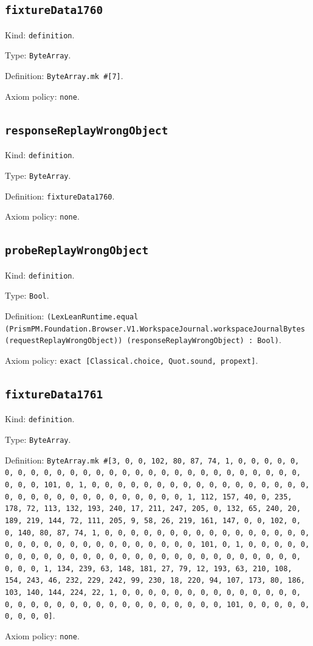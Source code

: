\documentclass[11pt]{article}
\begin{document}
\subsection*{\texttt{fixtureData1760}}
\noindent Kind: \texttt{definition}.\par
\noindent Type: \texttt{ByteArray}.\par
\noindent Definition: \texttt{ByteArray.mk \#[7]}.\par
\noindent Axiom policy: \texttt{none}.\par
\subsection*{\texttt{responseReplayWrongObject}}
\noindent Kind: \texttt{definition}.\par
\noindent Type: \texttt{ByteArray}.\par
\noindent Definition: \texttt{fixtureData1760}.\par
\noindent Axiom policy: \texttt{none}.\par
\subsection*{\texttt{probeReplayWrongObject}}
\noindent Kind: \texttt{definition}.\par
\noindent Type: \texttt{Bool}.\par
\noindent Definition: \texttt{(LexLeanRuntime.equal (PrismPM.Foundation.Browser.V1.WorkspaceJournal.workspaceJournalBytes (requestReplayWrongObject)) (responseReplayWrongObject) : Bool)}.\par
\noindent Axiom policy: \texttt{exact [Classical.choice, Quot.sound, propext]}.\par
\subsection*{\texttt{fixtureData1761}}
\noindent Kind: \texttt{definition}.\par
\noindent Type: \texttt{ByteArray}.\par
\noindent Definition: \texttt{ByteArray.mk \#[3, 0, 0, 102, 80, 87, 74, 1, 0, 0, 0, 0, 0, 0, 0, 0, 0, 0, 0, 0, 0, 0, 0, 0, 0, 0, 0, 0, 0, 0, 0, 0, 0, 0, 0, 0, 0, 0, 0, 101, 0, 1, 0, 0, 0, 0, 0, 0, 0, 0, 0, 0, 0, 0, 0, 0, 0, 0, 0, 0, 0, 0, 0, 0, 0, 0, 0, 0, 0, 0, 0, 0, 0, 1, 112, 157, 40, 0, 235, 178, 72, 113, 132, 193, 240, 17, 211, 247, 205, 0, 132, 65, 240, 20, 189, 219, 144, 72, 111, 205, 9, 58, 26, 219, 161, 147, 0, 0, 102, 0, 0, 140, 80, 87, 74, 1, 0, 0, 0, 0, 0, 0, 0, 0, 0, 0, 0, 0, 0, 0, 0, 0, 0, 0, 0, 0, 0, 0, 0, 0, 0, 0, 0, 0, 0, 0, 0, 101, 0, 1, 0, 0, 0, 0, 0, 0, 0, 0, 0, 0, 0, 0, 0, 0, 0, 0, 0, 0, 0, 0, 0, 0, 0, 0, 0, 0, 0, 0, 0, 0, 0, 1, 134, 239, 63, 148, 181, 27, 79, 12, 193, 63, 210, 108, 154, 243, 46, 232, 229, 242, 99, 230, 18, 220, 94, 107, 173, 80, 186, 103, 140, 144, 224, 22, 1, 0, 0, 0, 0, 0, 0, 0, 0, 0, 0, 0, 0, 0, 0, 0, 0, 0, 0, 0, 0, 0, 0, 0, 0, 0, 0, 0, 0, 0, 0, 0, 101, 0, 0, 0, 0, 0, 0, 0, 0, 0]}.\par
\noindent Axiom policy: \texttt{none}.\par
\end{document}
